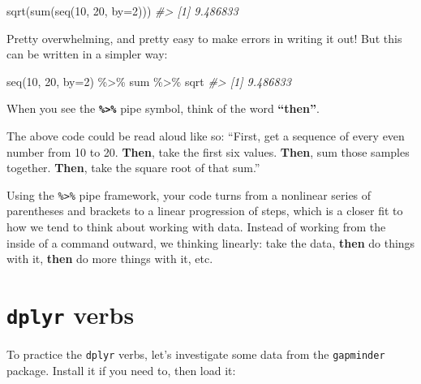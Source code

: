 \documentclass[
]{book}
\newenvironment{Shaded}{\begin{snugshade}}{\end{snugshade}}
\newcommand{\AttributeTok}[1]{\textcolor[rgb]{0.77,0.63,0.00}{#1}}
\newcommand{\CommentTok}[1]{\textcolor[rgb]{0.56,0.35,0.01}{\textit{#1}}}
\newcommand{\DecValTok}[1]{\textcolor[rgb]{0.00,0.00,0.81}{#1}}
\newcommand{\FunctionTok}[1]{\textcolor[rgb]{0.00,0.00,0.00}{#1}}
\newcommand{\NormalTok}[1]{#1}
\newcommand{\SpecialCharTok}[1]{\textcolor[rgb]{0.00,0.00,0.00}{#1}}
\begin{document}
\begin{Shaded}
\begin{Highlighting}[]
\FunctionTok{sqrt}\NormalTok{(}\FunctionTok{sum}\NormalTok{(}\FunctionTok{seq}\NormalTok{(}\DecValTok{10}\NormalTok{, }\DecValTok{20}\NormalTok{, }\AttributeTok{by=}\DecValTok{2}\NormalTok{)))}
\CommentTok{\#\textgreater{} [1] 9.486833}
\end{Highlighting}
\end{Shaded}

Pretty overwhelming, and pretty easy to make errors in writing it out! But this can be written in a simpler way:

\begin{Shaded}
\begin{Highlighting}[]
\FunctionTok{seq}\NormalTok{(}\DecValTok{10}\NormalTok{, }\DecValTok{20}\NormalTok{, }\AttributeTok{by=}\DecValTok{2}\NormalTok{) }\SpecialCharTok{\%\textgreater{}\%}\NormalTok{ sum }\SpecialCharTok{\%\textgreater{}\%}\NormalTok{ sqrt}
\CommentTok{\#\textgreater{} [1] 9.486833}
\end{Highlighting}
\end{Shaded}

When you see the \textbf{\texttt{\%\textgreater{}\%}} pipe symbol, think of the word \textbf{``then''}.

The above code could be read aloud like so: ``First, get a sequence of every even number from 10 to 20. \textbf{Then}, take the first six values. \textbf{Then}, sum those samples together. \textbf{Then}, take the square root of that sum.''

Using the \texttt{\%\textgreater{}\%} pipe framework, your code turns from a nonlinear series of parentheses and brackets to a linear progression of steps, which is a closer fit to how we tend to think about working with data. Instead of working from the inside of a command outward, we thinking linearly: take the data, \textbf{then} do things with it, \textbf{then} do more things with it, etc.

\hypertarget{dplyr-verbs}{%
\section*{\texorpdfstring{\texttt{dplyr} verbs}{dplyr verbs}}\label{dplyr-verbs}}

To practice the \texttt{dplyr} verbs, let's investigate some data from the \texttt{gapminder} package. Install it if you need to, then load it:
\end{document}
